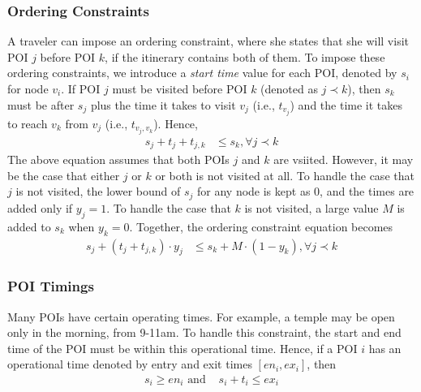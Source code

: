 \subsubsection{Ordering Constraints}
\label{eq:ordering}

A traveler can impose an ordering constraint, where she states that she will
visit POI $j$ before POI $k$, if the itinerary contains both of them.
To impose these ordering constraints, we introduce a \emph{start time} value for each POI, denoted by $s_i$ for node $v_i$.
If POI $j$ must be visited before POI $k$ (denoted as $j \prec k$), then $s_k$ must be after $s_j$ plus
the time it takes to visit $v_j$ (i.e., $t_{v_j}$) and the time it takes to
reach $v_k$ from $v_j$ (i.e., $t_{v_j,v_k}$).
Hence,
%
\begin{align}
	s_j + t_{j} + t_{j,k} & \leq s_k, \forall j \prec k
\end{align}
%
The above equation assumes that both POIs $j$ and $k$ are vsiited.
However, it may be the case that either $j$ or $k$ or both is not visited at all.
To handle the case that $j$ is not visited, the lower bound of $s_j$ for any
node is kept as $0$, and the times are added only if $y_j = 1$.
To handle the case that $k$ is not visited, a large value $M$ is added to $s_k$
when $y_k = 0$.
Together, the ordering constraint equation becomes
%
\begin{align}
	\label{eq:ordering}
	s_j + (t_{j} + t_{j,k}) \cdot y_j & \leq s_k + M \cdot (1 - y_k), \forall j \prec k
\end{align}
%

\subsubsection{POI Timings}

Many POIs have certain operating times.  For example, a temple may be open
only in the morning, from 9-11am.  To handle this constraint, the start and
end time of the POI must be within this operational time.  Hence, if a POI
$i$ has an operational time denoted by entry and exit times $[en_i, ex_i]$,
then
%
\begin{align}
	\label{eq:operational}
	s_i \geq en_i \text{ and } & s_i + t_{i} \leq ex_i
\end{align}

